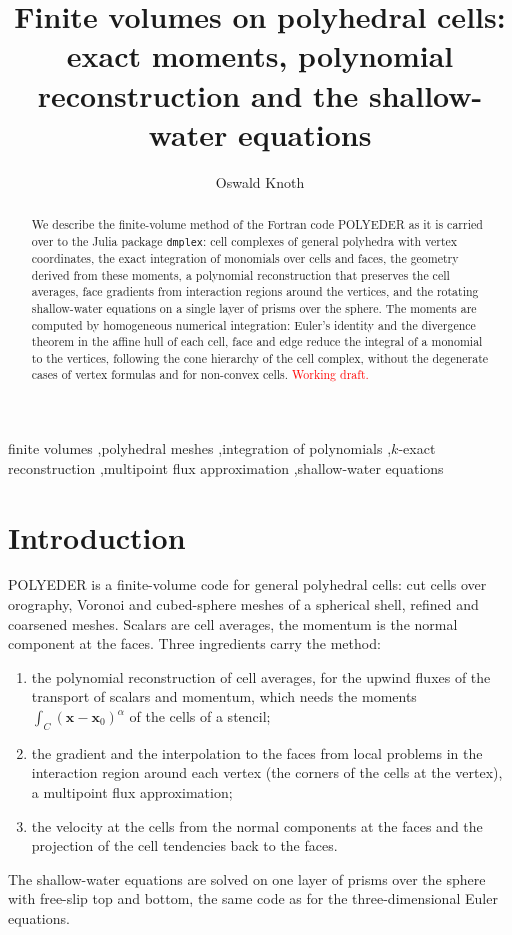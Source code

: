 \documentclass[preprint,12pt]{elsarticle}
\newcommand{\bx}{\mathbf{x}}
\newcommand{\code}[1]{\texttt{#1}}
\theoremstyle{definition}
\begin{document}
\begin{frontmatter}
\title{Finite volumes on polyhedral cells: exact moments, polynomial reconstruction and the
shallow-water equations}

\author{Oswald Knoth}

\begin{abstract}
We describe the finite-volume method of the Fortran code POLYEDER as it is carried over to the
Julia package \code{dmplex}: cell complexes of general polyhedra with vertex coordinates, the exact
integration of monomials over cells and faces, the geometry derived from these moments, a
polynomial reconstruction that preserves the cell averages, face gradients from interaction regions
around the vertices, and the rotating shallow-water equations on a single layer of prisms over the
sphere. The moments are computed by homogeneous numerical integration: Euler's identity and the
divergence theorem in the affine hull of each cell, face and edge reduce the integral of a monomial
to the vertices, following the cone hierarchy of the cell complex, without the degenerate cases of
vertex formulas and for non-convex cells.
\textcolor{red}{Working draft.}
\end{abstract}

\begin{keyword}
finite volumes \sep polyhedral meshes \sep integration of polynomials \sep $k$-exact reconstruction
\sep multipoint flux approximation \sep shallow-water equations
\end{keyword}
\end{frontmatter}

\section{Introduction}\label{sec:intro}

POLYEDER is a finite-volume code for general polyhedral cells: cut cells over orography, Voronoi and
cubed-sphere meshes of a spherical shell, refined and coarsened meshes. Scalars are cell averages,
the momentum is the normal component at the faces. Three ingredients carry the method:
\begin{enumerate}
\item the polynomial reconstruction of cell averages, for the upwind fluxes of the transport of
  scalars and momentum, which needs the moments $\int_C (\bx-\bx_0)^\alpha$ of the cells of a
  stencil;
\item the gradient and the interpolation to the faces from local problems in the interaction
  region around each vertex (the corners of the cells at the vertex), a multipoint flux approximation;
\item the velocity at the cells from the normal components at the faces and the projection of the
  cell tendencies back to the faces.
\end{enumerate}
The shallow-water equations are solved on one layer of prisms over the sphere with free-slip top and
bottom, the same code as for the three-dimensional Euler equations.
\end{document}
